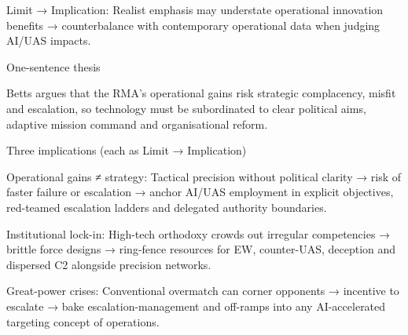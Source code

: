 Limit → Implication: Realist emphasis may understate operational innovation benefits → counterbalance with contemporary operational data when judging AI/UAS impacts.

One-sentence thesis

Betts argues that the RMA’s operational gains risk strategic complacency, misfit and escalation, so technology must be subordinated to clear political aims, adaptive mission command and organisational reform.

Three implications (each as Limit → Implication)

Operational gains ≠ strategy: Tactical precision without political clarity → risk of faster failure or escalation → anchor AI/UAS employment in explicit objectives, red-teamed escalation ladders and delegated authority boundaries.

Institutional lock-in: High-tech orthodoxy crowds out irregular competencies → brittle force designs → ring-fence resources for EW, counter-UAS, deception and dispersed C2 alongside precision networks.

Great-power crises: Conventional overmatch can corner opponents → incentive to escalate → bake escalation-management and off-ramps into any AI-accelerated targeting concept of operations.
